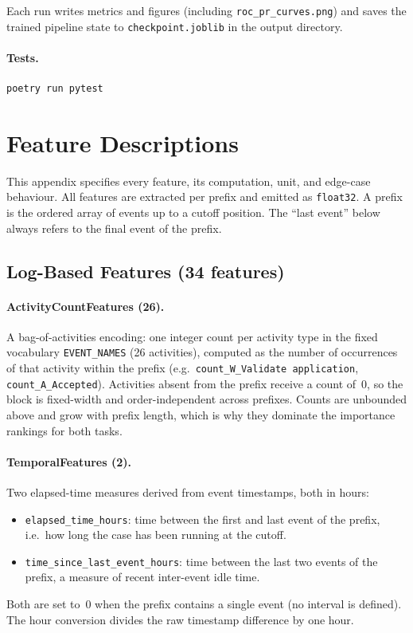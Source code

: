 \documentclass[runningheads]{llncs}
\begin{document}
Each run writes metrics and figures (including \texttt{roc\_pr\_curves.png}) and
saves the trained pipeline state to \texttt{checkpoint.joblib} in the output
directory.

\paragraph{Tests.}
\begin{verbatim}
poetry run pytest
\end{verbatim}

\section{Feature Descriptions}
\label{app:features}

This appendix specifies every feature, its computation, unit, and edge-case
behaviour. All features are extracted per prefix and emitted as
\texttt{float32}. A prefix is the ordered array of events up to a cutoff
position. The ``last event'' below always refers to the final event of the
prefix.

\subsection{Log-Based Features (34 features)}

\paragraph{ActivityCountFeatures (26).}
A bag-of-activities encoding: one integer count per activity type in the fixed
vocabulary \texttt{EVENT\_NAMES} (26 activities), computed as the number of
occurrences of that activity within the prefix
(e.g.\ \texttt{count\_W\_Validate application},
\texttt{count\_A\_Accepted}). Activities absent from the prefix receive a count
of~0, so the block is fixed-width and order-independent across prefixes. Counts
are unbounded above and grow with prefix length, which is why they dominate the
importance rankings for both tasks.

\paragraph{TemporalFeatures (2).}
Two elapsed-time measures derived from event timestamps, both in hours:
\begin{itemize}
    \item \texttt{elapsed\_time\_hours}: time between the first and last event
          of the prefix, i.e.\ how long the case has been running at the cutoff.
    \item \texttt{time\_since\_last\_event\_hours}: time between the last two
          events of the prefix, a measure of recent inter-event idle time.
\end{itemize}
Both are set to~0 when the prefix contains a single event (no interval is
defined). The hour conversion divides the raw timestamp difference by one hour.
\end{document}
